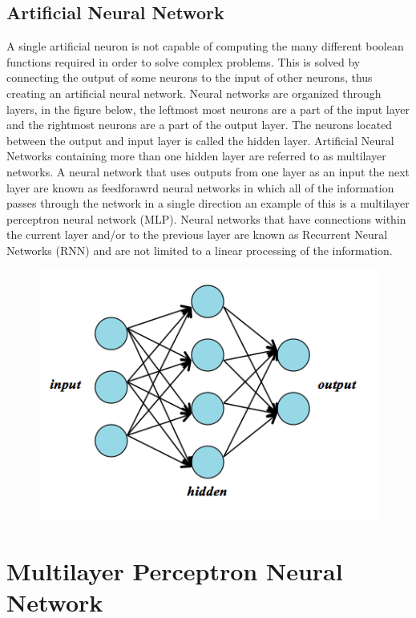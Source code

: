 \subsection{Artificial Neural Network}\label{sec:formatting}

A single artificial neuron is not capable of computing the many different boolean functions required in order to solve complex problems. This is solved by connecting the output of some neurons to the input of other neurons, thus creating an artificial neural network. Neural networks are organized through layers, in the figure below, the leftmost most neurons are a part of the input layer and the rightmost neurons are a part of the output layer. The neurons located between the output and input layer is called the hidden layer. Artificial Neural Networks containing more than one hidden layer are referred to as multilayer networks. A neural network that uses outputs from one layer as an input the next layer are known as feedforawrd neural networks in which all of the information passes through the network in a single direction an example of this is a multilayer perceptron neural network (MLP). Neural networks that have connections within the current layer and/or to the previous layer are known as Recurrent Neural Networks (RNN) and are not limited to a linear processing of the information. \cite{kar}
\begin{figure}[H]
\includegraphics[width=\columnwidth]{neuralnet}
\end{figure}
\section{Multilayer Perceptron Neural Network}\label{sec:Models}

